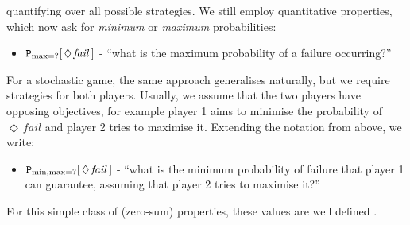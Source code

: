 \documentclass{llncs}
\begin{document}
quantifying over all possible strategies.
We still employ quantitative properties,
which now ask for \emph{minimum} or \emph{maximum} probabilities:
\vspace{-5pt}
\begin{itemize}
\item ${\tt P}_{\max=?}[\,\Diamond\,\mathit{fail}\,]$ -
``what is the maximum probability of a failure occurring?''
\end{itemize}
\vspace{-5pt}
For a stochastic game, the same approach generalises naturally,
but we require strategies for both players.
Usually, we assume that the two players have opposing objectives,
for example player 1 aims to minimise the probability of $\Diamond\,\mathit{fail}$
and player 2 tries to maximise it.
Extending the notation from above, we write:
\vspace{-5pt}
\begin{itemize}
\item ${\tt P}_{\min,\max=?}[\,\Diamond\,\mathit{fail}\,]$ -
``what is the minimum probability of failure that player 1 can guarantee,
assuming that player 2 tries to maximise it?''
\end{itemize}
\vspace{-5pt}
%
For this simple class of (zero-sum) properties,
these values are well defined \cite{Con92}.
\end{document}
